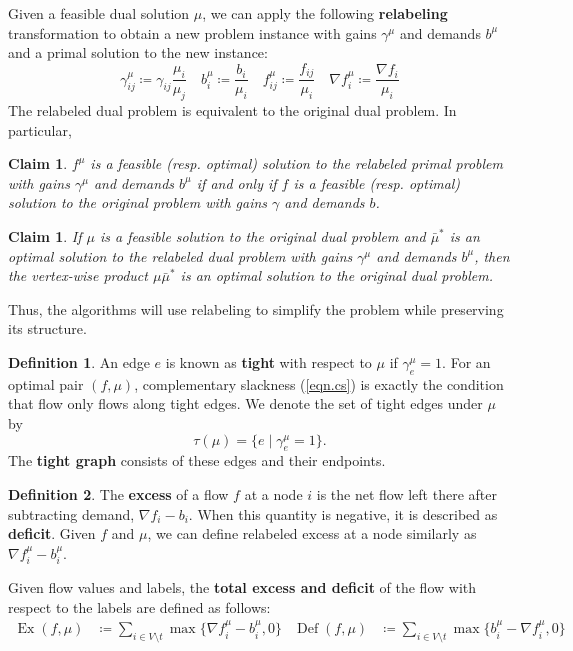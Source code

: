 \documentclass[11pt]{article}
\newtheorem{claim}[theorem]{Claim}
\theoremstyle{definition}
\newtheorem{definition}{Definition}[section]
\theoremstyle{definition}
\theoremstyle{definition}
\newcommand{\fu}{f^{\mu}}
\newcommand{\nfi}{\nabla f_i}
\newcommand{\nfiu}{\nabla \fu_i}
\newcommand{\biu}{b_{i}^{\mu}}
\newcommand{\geu}{\gamma_e^{\mu}}
\DeclareMathOperator{\Ex}{Ex}
\DeclareMathOperator{\Def}{Def}
\begin{document}
	Given a feasible dual solution $\mu$, we can apply the following \textbf{relabeling}
    transformation to obtain a new problem instance with gains $\gamma^\mu$ and demands $b^\mu$
    and a primal solution to the new instance:
		\begin{equation} \label{eqn:relabel} \tag{RE}
			\gamma_{ij}^\mu \coloneqq \gamma_{ij} \frac{\mu_i}{\mu_j} \quad
	b_i^\mu \coloneqq \frac{b_i}{\mu_i} \quad
    f_{ij}^\mu \coloneqq \frac{f_{ij}}{\mu_i} \quad
	\nabla f_i^\mu \coloneqq \frac{\nabla f_i }{\mu_i} \end{equation}
    The relabeled dual problem is equivalent to the original dual problem. In particular,
    \begin{claim}
    $f^\mu$ is a feasible (resp. optimal) solution to the relabeled primal problem with gains
    $\gamma^\mu$ and demands $b^\mu$ if and only if $f$ is a feasible (resp. optimal) solution
    to the original problem with gains $\gamma$ and demands $b$.
    \end{claim}
    \begin{claim}
    If $\mu$ is a feasible solution to the original dual problem and
    $\bar{\mu}^*$ is an optimal solution to the relabeled dual problem with gains
    $\gamma^\mu$ and demands $b^\mu$,
    then the vertex-wise product $\mu\bar{\mu}^*$ is an optimal solution to the original dual problem.
    \end{claim}
    \noindent Thus, the algorithms will use relabeling to simplify the problem while preserving its structure.
    \begin{definition} \label{def.tight}
	An edge $e$ is known as \textbf{tight} with respect to $\mu$ if $\gamma_e^\mu =1$.
	For an optimal pair $(f, \mu)$, complementary slackness (\ref{eqn.cs}) is exactly the condition that
	flow only flows along tight edges. We denote the set of tight edges under
	$\mu$ by
    \[ \tau(\mu) = \{e \mid \geu = 1\}. \]
    The \textbf{tight graph} consists of these edges and their endpoints.
	\end{definition}
    
    \begin{definition} The \textbf{excess} of a flow $f$ at a node $i$ is the net flow left
    there after subtracting demand, $\nfi - b_i$. When this quantity is negative, it is
    described as \textbf{deficit}. Given $f$ and $\mu$, we can define relabeled excess
    at a node similarly as $\nfiu - \biu$.
    
    Given flow values and labels, the \textbf{total excess and deficit}
    of the flow with respect to the labels are defined as follows:
	\begin{align*}
	\Ex(f,\mu)  &\coloneqq \sum_{i \in V \setminus t} \max \{ \nfiu - \biu, 0 \} &
	\Def(f,\mu) &\coloneqq \sum_{i \in V \setminus t} \max \{ \biu - \nfiu, 0 \}
	\end{align*}
    \end{definition}
  
\end{document}
